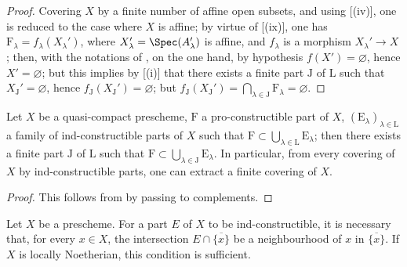 \begin{proof}
Covering $X$ by a finite number of affine open subsets, and using [(iv)], one is reduced to the case where $X$ is affine; by virtue of [(ix)], one has $\mathrm{F}_\lambda=f_\lambda(X_\lambda')$,
where $X_\lambda'=\Spec(A_\lambda')$ is affine, and $f_\lambda$ is a morphism $X_\lambda'\to X$; then, with the notations of , on the one hand, by hypothesis $f(X')=\varnothing$, hence $X'=\varnothing$; but this implies by [(i)] that there exists a finite part $\mathrm{J}$ of $\mathrm{L}$ such that $X_\mathrm{J}'=\varnothing$, hence $f_\mathrm{J}(X_\mathrm{J}')=\varnothing$; but $f_\mathrm{J}(X_\mathrm{J}')=\bigcap_{\lambda\in\mathrm{J}} \mathrm{F}_\lambda=\varnothing$.
\end{proof}

\begin{corollary}[1.9.9]
\label{IV.1.9.9}
Let $X$ be a quasi-compact prescheme, $\mathrm{F}$ a pro-constructible part of $X$, $(\mathrm{E}_\lambda)_{\lambda\in\mathrm{L}}$ a family of ind-constructible parts of $X$ such that $\mathrm{F}\subset\bigcup_{\lambda\in\mathrm{L}} \mathrm{E}_\lambda$; then there exists a finite part $\mathrm{J}$ of $\mathrm{L}$ such that $\mathrm{F}\subset\bigcup_{\lambda\in\mathrm{J}} \mathrm{E}_\lambda$.
In particular, from every covering of $X$ by ind-constructible parts, one can extract a finite covering of $X$.
\end{corollary}

\begin{proof}
This follows from  by passing to complements.
\end{proof}

\begin{proposition}[1.9.10]
\label{IV.1.9.10}
Let $X$ be a prescheme.
For a part $E$ of $X$ to be ind-constructible, it is necessary that, for every $x\in X$, the intersection $E\cap\overline{\{x\}}$ be a neighbourhood of $x$ in $\overline{\{x\}}$.
If $X$ is locally Noetherian, this condition is sufficient.
\end{proposition}


